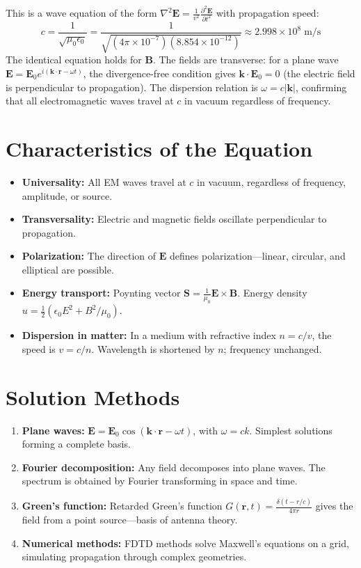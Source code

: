 \documentclass[11pt,openright]{book}
\begin{document}
This is a wave equation of the form $\nabla^2 \mathbf{E} = \frac{1}{v^2}\frac{\partial^2 \mathbf{E}}{\partial t^2}$ with propagation speed:
\begin{equation}
c = \frac{1}{\sqrt{\mu_0\epsilon_0}} = \frac{1}{\sqrt{(4\pi \times 10^{-7})(8.854 \times 10^{-12})}} \approx 2.998 \times 10^8 \;\text{m/s}
\end{equation}
The identical equation holds for $\mathbf{B}$. The fields are transverse: for a plane wave $\mathbf{E} = \mathbf{E}_0 e^{i(\mathbf{k}\cdot\mathbf{r} - \omega t)}$, the divergence-free condition gives $\mathbf{k} \cdot \mathbf{E}_0 = 0$ (the electric field is perpendicular to propagation). The dispersion relation is $\omega = c|\mathbf{k}|$, confirming that all electromagnetic waves travel at $c$ in vacuum regardless of frequency.

\section*{Characteristics of the Equation}

\begin{itemize}
\item \textbf{Universality:} All EM waves travel at $c$ in vacuum, regardless of frequency, amplitude, or source.
\item \textbf{Transversality:} Electric and magnetic fields oscillate perpendicular to propagation.
\item \textbf{Polarization:} The direction of $\mathbf{E}$ defines polarization---linear, circular, and elliptical are possible.
\item \textbf{Energy transport:} Poynting vector $\mathbf{S} = \frac{1}{\mu_0}\mathbf{E} \times \mathbf{B}$. Energy density $u = \frac{1}{2}(\epsilon_0 E^2 + B^2/\mu_0)$.
\item \textbf{Dispersion in matter:} In a medium with refractive index $n = c/v$, the speed is $v = c/n$. Wavelength is shortened by $n$; frequency unchanged.
\end{itemize}
\section*{Solution Methods}

\begin{enumerate}
\item \textbf{Plane waves:} $\mathbf{E} = \mathbf{E}_0 \cos(\mathbf{k} \cdot \mathbf{r} - \omega t)$, with $\omega = ck$. Simplest solutions forming a complete basis.
\item \textbf{Fourier decomposition:} Any field decomposes into plane waves. The spectrum is obtained by Fourier transforming in space and time.
\item \textbf{Green's function:} Retarded Green's function $G(\mathbf{r}, t) = \frac{\delta(t - r/c)}{4\pi r}$ gives the field from a point source---basis of antenna theory.
\item \textbf{Numerical methods:} FDTD methods solve Maxwell's equations on a grid, simulating propagation through complex geometries.
\end{enumerate}
\end{document}
